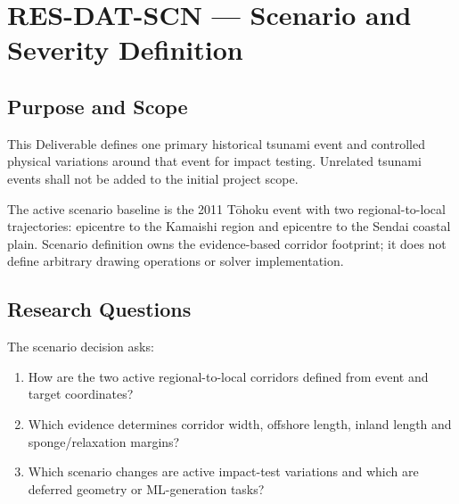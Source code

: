 
\section{RES-DAT-SCN --- Scenario and Severity Definition}
\label{sec:res-dat-scn}

\subsection{Purpose and Scope}
\label{sec:res-dat-scn-purpose}

This Deliverable defines one primary historical tsunami event and controlled
physical variations around that event for impact testing. Unrelated tsunami
events shall not be added to the initial project scope.

The active scenario baseline is the 2011 Tōhoku event with two
regional-to-local trajectories: epicentre to the Kamaishi region and
epicentre to the Sendai coastal plain. Scenario definition owns the
evidence-based corridor footprint; it does not define arbitrary drawing
operations or solver implementation.

\subsection{Research Questions}
\label{sec:res-dat-scn-research-questions}

The scenario decision asks:

\begin{enumerate}
  \item How are the two active regional-to-local corridors defined from
    event and target coordinates?
  \item Which evidence determines corridor width, offshore length,
    inland length and sponge/relaxation margins?
  \item Which scenario changes are active impact-test variations and
    which are deferred geometry or ML-generation tasks?
\end{enumerate}

